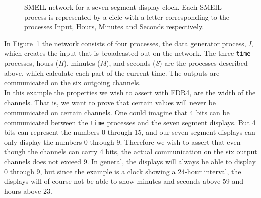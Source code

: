 \begin{figure}[!ht]
  \centering
  \caption{SMEIL network for a seven segment display clock. Each SMEIL process is represented by a cicle with a letter corresponding to the processes Input, Hours, Minutes and Seconds respectively.}
  \label{fig:smeil_network}
\end{figure}

In Figure~\ref{fig:smeil_network} the network consists of four processes, the data generator process, \textit{I}, which creates the input that is broadcasted out on the network. The three \texttt{time} processes, hours (\textit{H}), minutes (\textit{M}), and seconds (\textit{S}) are the processes described above, which calculate each part of the current time. The outputs are communicated on the six outgoing channels.\\

In this example the properties we wish to assert with FDR4, are the width of the channels. That is, we want to prove that certain values will never be communicated on certain channels.
One could imagine that 4 bits can be communicated between the \texttt{time} processes and the seven segment displays. But 4 bits can represent the numbers 0 through 15, and our seven segment displays can only display the numbers 0 through 9. Therefore we wish to assert that even though the channels can carry 4 bits, the actual communication on the six output channels does not exceed 9. In general, the displays will always be able to display 0 through 9, but since the example is a clock showing a 24-hour interval, the displays will of course not be able to show minutes and seconds above 59 and hours above 23.

